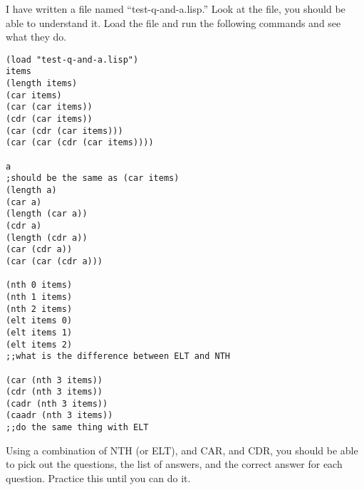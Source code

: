 \documentclass{article}
\begin{document}
I have written a file named ``test-q-and-a.lisp.'' Look at the file, you should be able to understand it. Load the file and run the following commands and see what they do.

\begin{multicols}{2}
    \begin{lstlisting}[caption = Commands to run]
(load "test-q-and-a.lisp")
items
(length items)
(car items)
(car (car items))
(cdr (car items))
(car (cdr (car items)))
(car (car (cdr (car items))))

a 
;should be the same as (car items)
(length a)
(car a)
(length (car a))
(cdr a)
(length (cdr a))
(car (cdr a))
(car (car (cdr a)))

(nth 0 items)
(nth 1 items)
(nth 2 items)
(elt items 0)
(elt items 1)
(elt items 2)
;;what is the difference between ELT and NTH

(car (nth 3 items))
(cdr (nth 3 items))
(cadr (nth 3 items))
(caadr (nth 3 items))
;;do the same thing with ELT
\end{lstlisting}
\end{multicols}

Using a combination of NTH (or ELT), and CAR, and CDR, you should be able to pick out the questions, the list of answers, and the correct answer for each question. Practice this until you can do it.
\end{document}
